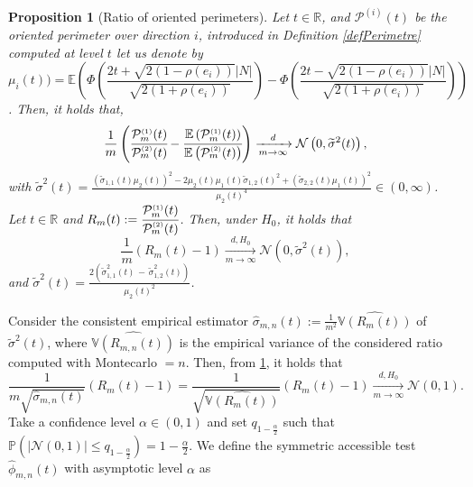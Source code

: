 \documentclass[12pt]{article}
\renewcommand{\tilde}{\widetilde}
\renewcommand{\hat}{\widehat}
\theoremstyle{Theorem}
\newtheorem{Proposition}[Theorem]{Proposition}
\begin{document}
\begin{Proposition}[Ratio of oriented perimeters]\label{deltamethodgeneralprop} 
Let  $t \in \mathbb{R}$, and $\mathcal{P}^{\scriptscriptstyle  (i) }(t)$ be the oriented perimeter over direction $i$, introduced in Definition \ref{defPerimetre} computed at level $t$ let us denote by $\mu_{i}(t)) = \mathbb{E}\left(\Phi\left(\dfrac{2t + \sqrt{2(1-\rho(e_i))}|N|}{\sqrt{2(1+\rho(e_i))}}\right)  - \Phi\left(\dfrac{2t - \sqrt{2(1-\rho(e_i))}|N|}{\sqrt{2(1+\rho(e_i))}}\right)\right)$. Then, it holds that,
\begin{equation*}
\frac{1}{m}\left(\cfrac{\mathcal{P}^{\scriptscriptstyle  (1) }_{m}(t)}{\mathcal{P}^{\scriptscriptstyle  (2)}_{m}(t)} - \cfrac{\mathbb{E}\left(\mathcal{P}^{\scriptscriptstyle  (1) }_{m}(t)\right)}{\mathbb{E}\left(\mathcal{P}^{\scriptscriptstyle  (2)}_{m}(t)\right)} \right)  \xrightarrow[m \to \infty]{d} \mathcal{N}\left(0,  \tilde{\sigma}^{2}(t) \right),
\end{equation*}
with $\tilde{\sigma}^{2}(t) = \frac{(\tilde{\sigma}_{\scriptscriptstyle 1,1}(t)\mu_{2}(t))^{2} - 2\mu_{2}(t)\mu_{1}(t)\tilde{\sigma}_{\scriptscriptstyle 1,2}(t)^{2} +(\tilde{\sigma}_{\scriptscriptstyle 2,2}(t)\mu_{1}(t))^{2}}{\mu_{2}(t)^4} \in (0, \infty)$. \\
Let $t \in \mathbb{R}$  and  $R_{m}(t) := \cfrac{\mathcal{P}^{\scriptscriptstyle  (1) }_{m}(t)}{\mathcal{P}^{\scriptscriptstyle  (2) }_{m}(t)}$. Then, under $H_{0}$, it holds that
\begin{equation}\label{ratiounderH0}
\frac{1}{m}\left(R_{m}(t) - 1 \right)  \xrightarrow[m \to \infty]{d, H_0} \mathcal{N}\left(0,  \tilde{\sigma}^{2}(t)  \right),
\end{equation} 
and $\tilde{\sigma}^{2}(t) = \frac{2\left(\tilde{\sigma}_{\scriptscriptstyle 1,1}^{2}(t) \, - \, \tilde{\sigma}_{\scriptscriptstyle 1,2}^{2}(t)\right)}{\mu_{2}(t)^2}$.
\end{Proposition}
Consider the consistent empirical estimator $\hat{\sigma}_{m,n}(t):= \frac{1}{m^2}\hat{\mathbb{V}\left(R_{m}(t)\right)}$ of $\tilde{\sigma}^{2}(t)$, where $\hat{\mathbb{V}\left(R_{m, n}(t)\right)}$ is the empirical variance of the considered ratio computed with Montecarlo $= n$. Then, from \ref{deltamethodgeneralprop}, it holds that 
$$ \frac{1}{m\sqrt{\hat{\sigma}_{m,n}(t)}}\left(R_{m}(t) - 1 \right) = \frac{1}{\sqrt{\hat{\mathbb{V}\left(R_{m}(t)\right)}}}\left(R_{m}(t) - 1 \right)   \xrightarrow[m \to \infty]{d, H_{0}} \mathcal{N}\left(0, 1 \right).$$
Take a confidence level $\alpha \in (0,1)$ and set $q_{1-\frac{\alpha}{2}}$ such that $\mathbb{P}\left(|\mathcal{N}\left(0,1\right)| \leq  q_{1-\frac{\alpha}{2}} \right) = 1 - \frac{\alpha}{2}$. We define the symmetric accessible test $\hat{\phi}_{m, n}(t)$ with asymptotic level $\alpha$ as 
\end{document}
